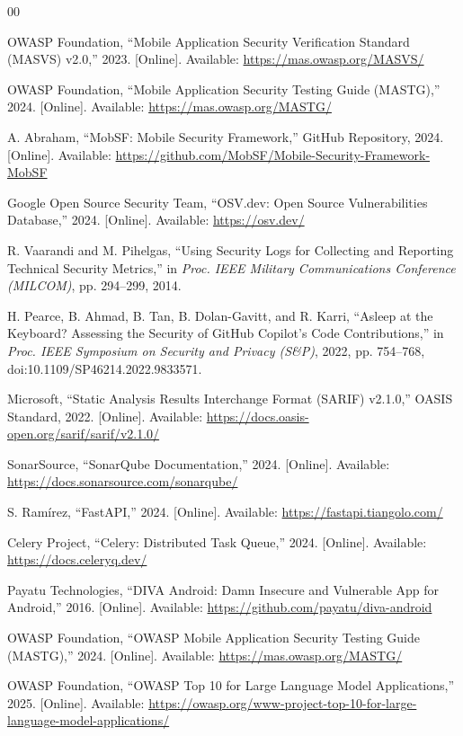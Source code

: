 \documentclass[preprint,12pt,a4paper]{elsarticle}
\begin{document}
\begin{thebibliography}{00}

OWASP Foundation, ``Mobile Application Security Verification Standard (MASVS) v2.0,''
2023. [Online]. Available: \url{https://mas.owasp.org/MASVS/}

OWASP Foundation, ``Mobile Application Security Testing Guide (MASTG),''
2024. [Online]. Available: \url{https://mas.owasp.org/MASTG/}

A. Abraham,
``MobSF: Mobile Security Framework,''
GitHub Repository, 2024.
[Online]. Available:
\url{https://github.com/MobSF/Mobile-Security-Framework-MobSF}

Google Open Source Security Team,
``OSV.dev: Open Source Vulnerabilities Database,''
2024. [Online]. Available: \url{https://osv.dev/}

R. Vaarandi and M. Pihelgas, ``Using Security Logs for Collecting and Reporting
Technical Security Metrics,'' in \textit{Proc. IEEE Military Communications Conference
(MILCOM)}, pp. 294--299, 2014.

H. Pearce, B. Ahmad, B. Tan, B. Dolan-Gavitt, and R. Karri,
``Asleep at the Keyboard? Assessing the Security of GitHub Copilot's Code Contributions,''
in \textit{Proc. IEEE Symposium on Security and Privacy (S\&P)}, 2022,
pp. 754--768, doi:10.1109/SP46214.2022.9833571.

Microsoft, ``Static Analysis Results Interchange Format (SARIF) v2.1.0,''
OASIS Standard, 2022. [Online]. Available: \url{https://docs.oasis-open.org/sarif/sarif/v2.1.0/}

SonarSource, ``SonarQube Documentation,'' 2024.
[Online]. Available: \url{https://docs.sonarsource.com/sonarqube/}

S. Ram\'irez, ``FastAPI,'' 2024.
[Online]. Available: \url{https://fastapi.tiangolo.com/}

Celery Project, ``Celery: Distributed Task Queue,'' 2024.
[Online]. Available: \url{https://docs.celeryq.dev/}

Payatu Technologies, ``DIVA Android: Damn Insecure and Vulnerable App for Android,'' 2016. [Online]. Available: \url{https://github.com/payatu/diva-android}

OWASP Foundation, ``OWASP Mobile Application Security Testing Guide (MASTG),'' 2024. [Online]. Available: \url{https://mas.owasp.org/MASTG/}

OWASP Foundation,
``OWASP Top 10 for Large Language Model Applications,''
2025.
[Online]. Available:
\url{https://owasp.org/www-project-top-10-for-large-language-model-applications/}
\end{thebibliography}
\end{document}

